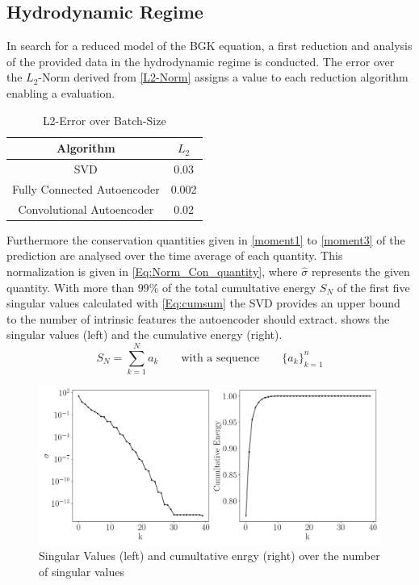 \documentclass[12pt, a4paper]{article}
\begin{document}
\subsection{Hydrodynamic Regime}
In search for a reduced model of the BGK equation, a first reduction and analysis of the provided data in the hydrodynamic regime is conducted. The error over the $L_2$-Norm derived from \cref{L2-Norm} assigns a value to each reduction algorithm enabling a evaluation.
\begin{table}[!htbp]\centering
	\begin{tabular}{ |c c| }
		\hline
		Algorithm & $L_2$ \\[.5ex]
		\hline
		SVD & 0.03  \\ 
		Fully Connected Autoencoder & 0.002 \\ 
		Convolutional Autoencoder & 0.02 \\ \hline
		\hline
	\end{tabular}
	\caption{L2-Error over Batch-Size}
	\label{Tab:Batch}
\end{table}
Furthermore the conservation quantities given in \cref{moment1} to \cref{moment3} of the prediction are analysed over the time average of each quantity. This normalization is given in \cref{Eq:Norm_Con_quantity}, where $\hat{\sigma}$ represents the given quantity.  
With more than $99\%$ of the total cumultative energy $S_N$ of the first five singular values calculated with \cref{Eq:cumsum} the SVD provides an upper bound to the number of intrinsic features the autoencoder should extract.  shows the singular values (left) and the cumulative energy (right).
\begin{equation}
S_N = \sum_{k=1}^{N}a_k \qquad\textrm{with a sequence} \qquad\{a_k\}_{k=1}^{n} 
\label{Eq:cumsum}
\end{equation}  
\begin{figure}[!htbp]
	\centering
	\includegraphics[width=\textwidth]{Figures/Cumultative_Singular_Values_kn001.png}
	\caption{Singular Values (left) and cumultative enrgy (right) over the number of singular values}
	\label{Fig:cumu_sing}
\end{figure}
\end{document}
